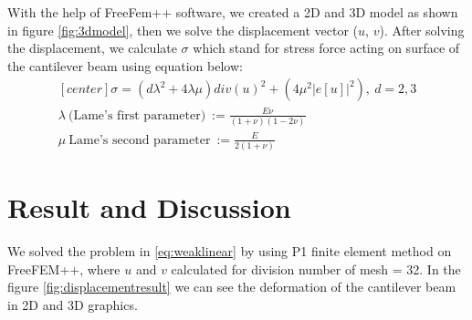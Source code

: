 \documentclass[a4paper,11pt]{article}
\begin{document}
With the help of FreeFem++ software, we created a 2D and 3D model as shown in figure \ref{fig:3dmodel}, then we solve the displacement vector ($u$, $v$). After solving the displacement, we calculate $\sigma$ which stand for stress force acting on surface of the cantilever beam using equation below:
\begin{equation*}
\begin{aligned}[center]
\sigma = (d \lambda^2 + 4\lambda\mu)div(u)^2 + (4\mu^2 |e[u]|^2),\ d=2,3\\
\lambda\ \text{(Lame's first parameter)}\ := \frac{E\nu}{(1+\nu)(1-2\nu)}\\
\mu\ \text{Lame's second parameter}\ := \frac{E}{2(1+\nu)}
\end{aligned}
\end{equation*}
\newpage
\section{Result and Discussion}
We solved the problem in \eqref{eq:weaklinear} by using P1 finite element method on FreeFEM++, where $u$ and $v$ calculated for division number of mesh = 32. In the figure \ref{fig:displacementresult} we can see the deformation of the cantilever beam in 2D and 3D graphics.
\end{document}
